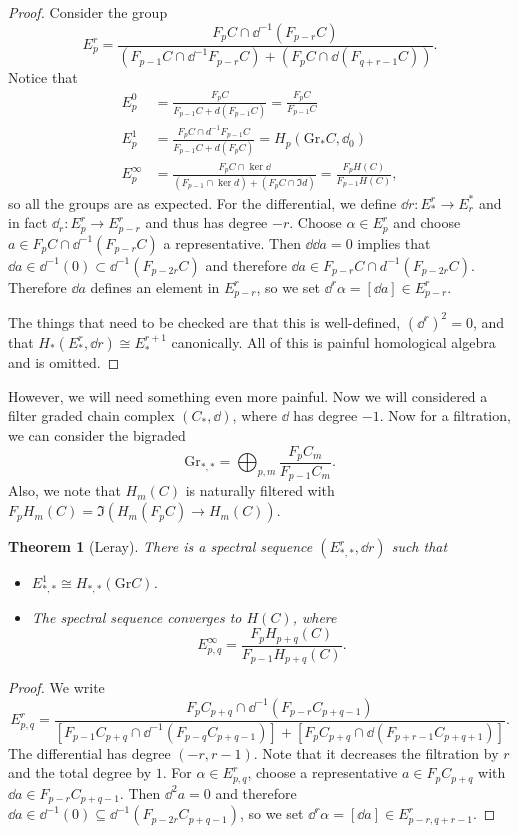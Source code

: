 \documentclass[leqno, openany]{memoir}
\newtheorem{thm}{Theorem}[section]
\theoremstyle{definition}
\theoremstyle{remark}
\theoremstyle{plain}
\theoremstyle{definition}
\theoremstyle{remark}
\newcommand{\mr}[1]{\mathrm{#1}}
\begin{document}
\begin{proof} Consider the group \[ E_p^r = \frac{F_p C \cap \dd^{-1}(F_{p-r}
    C)}{(F_{p-1} C \cap \dd^{-1} F_{p-r} C) + (F_p C \cap \dd(F_{q+r-1} C))}.
    \] Notice that \begin{align*} E_p^0 &= \frac{F_p C}{F_{p-1} C + d(F_{p-1}
    C)} = \frac{F_p C}{F_{p-1} C} \\ E_p^1 &= \frac{F_p C \cap d^{-1} F_{p-1}
C}{F_{p-1}C + d(F_p C)} = H_p(\mr{Gr}_* C, \dd_0) \\ E_p^{\infty} &= \frac{F_p
C \cap \ker \dd}{(F_{p-1} \cap \ker d) + (F_p C \cap \Im d)} = \frac{F_p
H(C)}{F_{p-1} H(C)}, \end{align*} so all the groups are as expected. For the
differential, we define $\dd{r} \colon E_*^r \to E_r^*$ and in fact $\dd_r
\colon E_p^r \to E_{p-r}^r$ and thus has degree $-r$. Choose $\alpha \in E_p^r$
and choose $a \in F_p C \cap \dd^{-1}(F_{p-r} C)$ a representative. Then
$\dd{\dd{a}} = 0$ implies that $\dd{a} \in \dd^{-1}(0) \subset
\dd^{-1}(F_{p-2r} C)$ and therefore $\dd{a} \in F_{p-r} C \cap d^{-1}(F_{p-2r}
C)$. Therefore $\dd{a}$ defines an element in $E_{p-r}^r$, so we set $\dd^r
\alpha = [\dd{a}] \in E_{p-r}^r$.

    The things that need to be checked are that this is well-defined,
${(\dd^r)}^2 = 0$, and that $H_*(E_*^r, \dd{r}) \cong E_*^{r+1}$ canonically.
All of this is painful homological algebra and is omitted.  \end{proof}

However, we will need something even more painful. Now we will considered a
filter graded chain complex $(C_*, \dd)$, where $\dd$ has degree $-1$. Now for
a filtration, we can consider the bigraded \[ \mr{Gr}_{*,*} = \bigoplus_{p,m}
\frac{F_p C_m}{F_{p-1} C_m}. \] Also, we note that $H_m(C)$ is naturally
filtered with $F_p H_m(C) = \Im(H_m (F_p C) \to H_m(C))$.

\begin{thm}[Leray] There is a spectral sequence $(E_{*,*}^r, \dd{r})$ such that
    \begin{itemize} \item $E^1_{*,*} \cong H_{*,*}(\mr{Gr} C)$.  \item The
        spectral sequence converges to $H(C)$, where \[ E_{p,q}^{\infty} =
        \frac{F_p H_{p+q}(C)}{F_{p-1}H_{p+q}(C)}. \] \end{itemize} \end{thm}

\begin{proof} We write \[ E_{p,q}^r = \frac{F_p C_{p+q} \cap \dd^{-1} (F_{p-r}
C_{p+q-1})}{[F_{p-1} C_{p+q} \cap \dd^{-1}(F_{p-q}C_{p+q-1})] + [F_p C_{p+q}
\cap \dd(F_{p+r-1} C_{p+q+1})]}. \] The differential has degree $(-r, r-1)$.
Note that it decreases the filtration by $r$ and the total degree by $1$. For
$\alpha \in E_{p,q}^r$, choose a representative $a \in F_p C_{p+q}$ with
$\dd{a} \in F_{p-r} C_{p+q-1}$. Then $\dd^2 a = 0$ and therefore $\dd{a} \in
\dd^{-1}(0) \subseteq \dd^{-1}(F_{p-2r} C_{p+q-1})$, so we set $\dd^r \alpha =
[\dd{a}] \in E_{p-r, q+r-1}^r$.  \end{proof}
\end{document}
